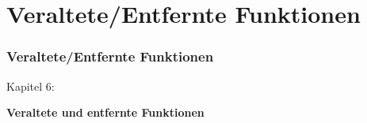 %

\section{Veraltete/Entfernte Funktionen}
\begin{frame}[fragile]
	\frametitle{Veraltete/Entfernte Funktionen}

	\begin{center}\huge{Kapitel 6:}\end{center}
	\begin{center}\huge{\color{typo3darkgrey}\textbf{Veraltete und entfernte Funktionen}}\end{center}

\end{frame}


